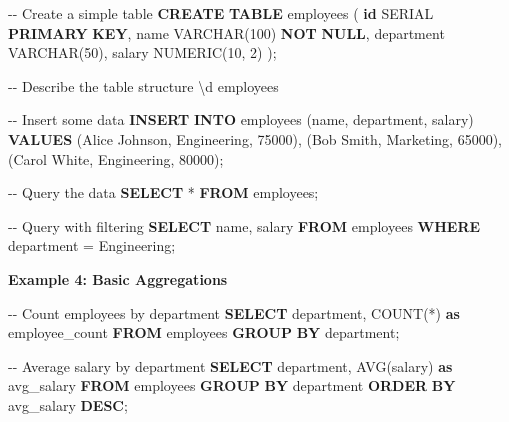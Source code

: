 \documentclass[
  letterpaper,
  DIV=11,
  numbers=noendperiod]{scrartcl}
\newenvironment{Shaded}{\begin{snugshade}}{\end{snugshade}}
\newcommand{\CommentTok}[1]{\textcolor[rgb]{0.37,0.37,0.37}{#1}}
\newcommand{\DataTypeTok}[1]{\textcolor[rgb]{0.68,0.00,0.00}{#1}}
\newcommand{\DecValTok}[1]{\textcolor[rgb]{0.68,0.00,0.00}{#1}}
\newcommand{\FunctionTok}[1]{\textcolor[rgb]{0.28,0.35,0.67}{#1}}
\newcommand{\KeywordTok}[1]{\textcolor[rgb]{0.00,0.23,0.31}{\textbf{#1}}}
\newcommand{\NormalTok}[1]{\textcolor[rgb]{0.00,0.23,0.31}{#1}}
\newcommand{\OperatorTok}[1]{\textcolor[rgb]{0.37,0.37,0.37}{#1}}
\newcommand{\StringTok}[1]{\textcolor[rgb]{0.13,0.47,0.30}{#1}}
\begin{document}
\begin{Shaded}
\begin{Highlighting}[]
\CommentTok{{-}{-} Create a simple table}
\KeywordTok{CREATE} \KeywordTok{TABLE}\NormalTok{ employees (}
    \KeywordTok{id}\NormalTok{ SERIAL }\KeywordTok{PRIMARY} \KeywordTok{KEY}\NormalTok{,}
\NormalTok{    name }\DataTypeTok{VARCHAR}\NormalTok{(}\DecValTok{100}\NormalTok{) }\KeywordTok{NOT} \KeywordTok{NULL}\NormalTok{,}
\NormalTok{    department }\DataTypeTok{VARCHAR}\NormalTok{(}\DecValTok{50}\NormalTok{),}
\NormalTok{    salary }\DataTypeTok{NUMERIC}\NormalTok{(}\DecValTok{10}\NormalTok{, }\DecValTok{2}\NormalTok{)}
\NormalTok{);}

\CommentTok{{-}{-} Describe the table structure}
\NormalTok{\textbackslash{}d employees}

\CommentTok{{-}{-} Insert some data}
\KeywordTok{INSERT} \KeywordTok{INTO}\NormalTok{ employees (name, department, salary) }\KeywordTok{VALUES}
\NormalTok{    (}\StringTok{\textquotesingle{}Alice Johnson\textquotesingle{}}\NormalTok{, }\StringTok{\textquotesingle{}Engineering\textquotesingle{}}\NormalTok{, }\DecValTok{75000}\NormalTok{),}
\NormalTok{    (}\StringTok{\textquotesingle{}Bob Smith\textquotesingle{}}\NormalTok{, }\StringTok{\textquotesingle{}Marketing\textquotesingle{}}\NormalTok{, }\DecValTok{65000}\NormalTok{),}
\NormalTok{    (}\StringTok{\textquotesingle{}Carol White\textquotesingle{}}\NormalTok{, }\StringTok{\textquotesingle{}Engineering\textquotesingle{}}\NormalTok{, }\DecValTok{80000}\NormalTok{);}

\CommentTok{{-}{-} Query the data}
\KeywordTok{SELECT} \OperatorTok{*} \KeywordTok{FROM}\NormalTok{ employees;}

\CommentTok{{-}{-} Query with filtering}
\KeywordTok{SELECT}\NormalTok{ name, salary }\KeywordTok{FROM}\NormalTok{ employees }\KeywordTok{WHERE}\NormalTok{ department }\OperatorTok{=} \StringTok{\textquotesingle{}Engineering\textquotesingle{}}\NormalTok{;}
\end{Highlighting}
\end{Shaded}

\textbf{Example 4: Basic Aggregations}

\begin{Shaded}
\begin{Highlighting}[]
\CommentTok{{-}{-} Count employees by department}
\KeywordTok{SELECT}\NormalTok{ department, }\FunctionTok{COUNT}\NormalTok{(}\OperatorTok{*}\NormalTok{) }\KeywordTok{as}\NormalTok{ employee\_count}
\KeywordTok{FROM}\NormalTok{ employees}
\KeywordTok{GROUP} \KeywordTok{BY}\NormalTok{ department;}

\CommentTok{{-}{-} Average salary by department}
\KeywordTok{SELECT}\NormalTok{ department, }\FunctionTok{AVG}\NormalTok{(salary) }\KeywordTok{as}\NormalTok{ avg\_salary}
\KeywordTok{FROM}\NormalTok{ employees}
\KeywordTok{GROUP} \KeywordTok{BY}\NormalTok{ department}
\KeywordTok{ORDER} \KeywordTok{BY}\NormalTok{ avg\_salary }\KeywordTok{DESC}\NormalTok{;}
\end{Highlighting}
\end{Shaded}
\end{document}
